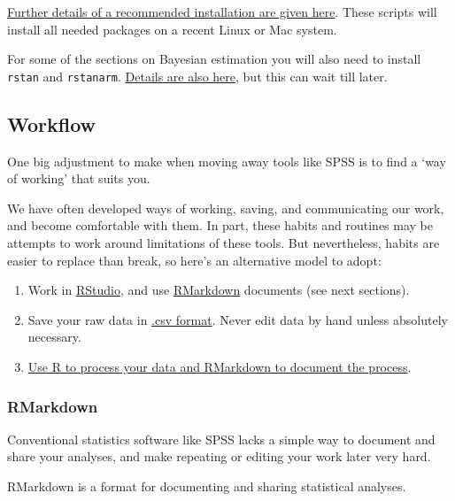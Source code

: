 \documentclass[]{article}
\begin{document}
\href{https://github.com/PlymouthPsychology/installR}{Further details of a recommended installation are given here}.
These scripts will install all needed packages on a recent Linux or Mac system.

For some of the sections on Bayesian estimation you will also need to install
\texttt{rstan} and \texttt{rstanarm}.
\href{https://github.com/PlymouthPsychology/installR}{Details are also here}, but
this can wait till later.

\hypertarget{start-here}{%
\subsection*{Workflow}\label{start-here}}

One big adjustment to make when moving away tools like SPSS is to find a `way of
working' that suits you.

We have often developed ways of working, saving, and communicating our work, and
become comfortable with them. In part, these habits and routines may be attempts
to work around limitations of these tools. But nevertheless, habits are easier
to replace than break, so here's an alternative model to adopt:

\begin{enumerate}
\def\labelenumi{\arabic{enumi}.}
\item
  Work in \protect\hyperlink{rstudio}{RStudio}, and use \protect\hyperlink{rmarkdown}{RMarkdown} documents (see
  next sections).
\item
  Save your raw data in \protect\hyperlink{use-csv}{.csv format}. Never edit data by hand unless
  absolutely necessary.
\item
  \protect\hyperlink{save-intermediate-steps}{Use R to process your data and RMarkdown to document the process}.
\end{enumerate}

\hypertarget{rmarkdown}{%
\subsubsection*{RMarkdown}\label{rmarkdown}}

Conventional statistics software like SPSS lacks a simple way to document and
share your analyses, and make repeating or editing your work later very hard.

RMarkdown is a format for documenting and sharing statistical analyses.
\end{document}

